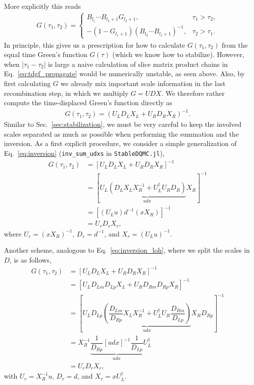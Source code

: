 \documentclass[%
 reprint,
superscriptaddress,
citeautoscript,
showpacs,
 amsmath,amssymb,
 aps,
 prb,
longbibliography,
]{revtex4-1}
\begin{document}
More explicitly this reads
\begin{align}
	G(\tau_1, \tau_2) = \begin{cases}
	B_{l_1} \cdots B_{l_2 + 1} G_{l_2 + 1}, &\tau_1 > \tau_2,\\
	- \left( 1 - G_{l_1 + 1} \right) \left( B_{l_2} \cdots B_{l_1 + 1}\right)^{-1}, &\tau_2 > \tau_1.
	\end{cases} \label{eq:tdgf_propagate}
\end{align}
In principle, this gives us a prescription for how to calculate $G(\tau_1, \tau_2)$ from the equal time Green's function $G(\tau)$ (which we know how to stabilize). However, when $|\tau_1 - \tau_2|$ is large a naive calculation of slice matrix product chains in Eq.~\ref{eq:tdgf_propagate} would be numerically unstable, as seen above. Also, by first calculating $G$ we already mix important scale information in the last recombination step, in which we multiply $G = UDX$. We therefore rather compute the time-displaced Green's function directly as
\begin{align}
	G(\tau_1, \tau_2) = (U_L D_L X_L + U_R D_R X_R)^{-1}.
\end{align}
Similar to Sec.~\ref{sec:stabilization}, we must be very careful to keep the involved scales separated as much as possible when performing the summation and the inversion.
As a first explicit procedure, we consider a simple generalization of Eq.~\ref{eq:inversion} (\texttt{inv\_sum\_udxs} in \texttt{StableDQMC.jl}),
\begin{align}
	G(\tau_1, \tau_2) &= [U_L D_L X_L + U_R D_R X_R]^{-1} \nonumber\\
	&= [U_L \underbrace{(D_L X_L X_R^{-1} + U_L^\dagger U_R D_R)}_{udx} X_R ]^{-1} \nonumber\\
	&= [(U_L u) d^{-1} (x X_R)]^{-1} \\
	&= U_r D_r X_r, 
\end{align}
where $U_r = (x X_R)^{-1}$, $D_r = d^{-1}$, and $X_r = (U_L u)^{-1}$.

Another scheme, analogous to Eq.~\ref{eq:inversion_loh}, where we split the scales in $D$, is as follows,
\begin{align}
	G(\tau_1, \tau_2) &= [U_L D_L X_L + U_R D_R X_R]^{-1} \nonumber\\
	&= [U_L D_{Lm} D_{Lp} X_L + U_R D_{Rm} D_{Rp} X_R]^{-1} \nonumber\\
	&= \left[U_L D_{Lp} \underbrace{\left( \dfrac{D_{Lm}}{D_{Rp}} X_L X_R^{-1} + U_L^\dagger U_R \dfrac{D_{Rm}}{D_{Lp}} \right)}_{udx} X_R D_{Rp} \right]^{-1} \nonumber\\
	&= X_R^{-1} \underbrace{\dfrac{1}{D_{Rp}} [udx]^{-1} \dfrac{1}{D_{Lp}}}_{udx} U_L^\dagger \\
	&= U_r D_r X_r,
\end{align}
with $U_r = X_R^{-1} u$, $D_r = d$, and $X_r = x U_L^\dagger$.







\clearpage

\end{document}
